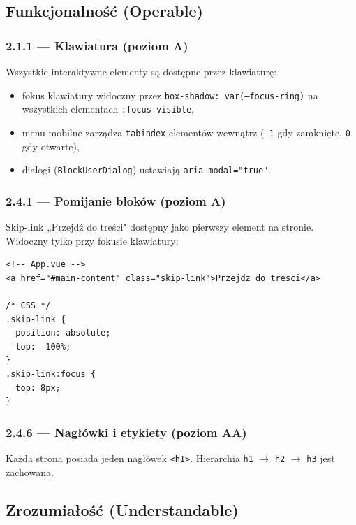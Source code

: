 \documentclass[12pt, a4paper]{article}
\begin{document}
\subsection{Funkcjonalność (Operable)}

\subsubsection{2.1.1 — Klawiatura (poziom A)}

Wszystkie interaktywne elementy są dostępne przez klawiaturę:

\begin{itemize}
  \item fokus klawiatury widoczny przez \texttt{box-shadow: var(--focus-ring)}
        na wszystkich elementach \texttt{:focus-visible},
  \item menu mobilne zarządza \texttt{tabindex} elementów wewnątrz
        (\texttt{-1} gdy zamknięte, \texttt{0} gdy otwarte),
  \item dialogi (\texttt{BlockUserDialog}) ustawiają \texttt{aria-modal="true"}.
\end{itemize}

\subsubsection{2.4.1 — Pomijanie bloków (poziom A)}

Skip-link „Przejdź do treści" dostępny jako pierwszy element na stronie.
Widoczny tylko przy fokusie klawiatury:

\begin{lstlisting}[style=html, caption={Implementacja skip-linka}]
<!-- App.vue -->
<a href="#main-content" class="skip-link">Przejdz do tresci</a>

/* CSS */
.skip-link {
  position: absolute;
  top: -100%;
}
.skip-link:focus {
  top: 8px;
}
\end{lstlisting}

\subsubsection{2.4.6 — Nagłówki i etykiety (poziom AA)}

Każda strona posiada jeden nagłówek \texttt{<h1>}. Hierarchia
\texttt{h1} $\to$ \texttt{h2} $\to$ \texttt{h3} jest zachowana.

\subsection{Zrozumiałość (Understandable)}
\end{document}
